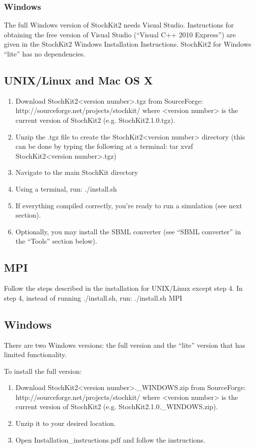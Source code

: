 \documentclass[11pt,letterpaper]{article}
\begin{document}
\subsubsection*{Windows}
The full Windows version of StochKit2 needs Visual Studio.  Instructions for obtaining the free version of Visual Studio (``Visual C++ 2010 Express'') are given in the StochKit2 Windows Installation Instructions. StochKit2 for Windows ``lite'' has no dependencies.

\subsection{UNIX/Linux and Mac OS X}

\begin{enumerate}
    \item Download StochKit2<version number>.tgz from SourceForge: http://sourceforge.net/projects/stochkit/
where <version number> is the current version of StochKit2 (e.g. StochKit2.1.0.tgz).
\item Unzip the .tgz file to create the StochKit2<version number> directory (this can be done by typing the following at a terminal: tar xvzf StochKit2<version number>.tgz)
\item Navigate to the main StochKit directory
\item Using a terminal, run: ./install.sh
\item If everything compiled correctly, you’re ready to run a simulation (see next section).
\item Optionally, you may install the SBML converter (see ``SBML converter'' in the ``Tools'' section below).
\end{enumerate}

\subsection{MPI}

Follow the steps described in the installation for UNIX/Linux except step 4. In step 4, instead of running 
./install.sh,
run:
./install.sh MPI

\subsection{Windows}

There are two Windows versions: the full version and the ``lite'' version that has limited functionality.

To install the full version:
\begin{enumerate}
    \item Download StochKit2<version number>.\_WINDOWS.zip from SourceForge: http://sourceforge.net/projects/stochkit/
where <version number> is the current version of StochKit2 (e.g. StochKit2.1.0.\_WINDOWS.zip).
\item Unzip it to your desired location.
\item Open Installation\_instructions.pdf and follow the instructions.
\end{enumerate}
\end{document}
